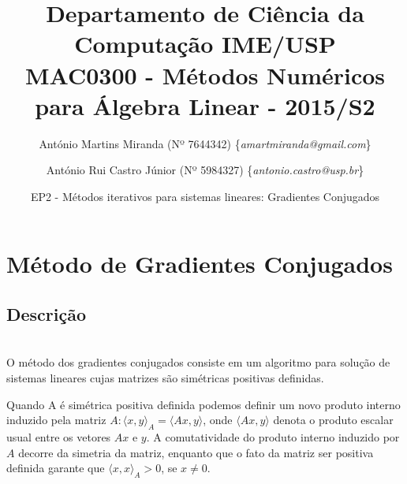 \documentclass[a4paper,11pt]{article}
\begin{document}
\lstset{language=C}
\small{
  \title{
    {\small
      Departamento de Ciência da Computação \hfill IME/USP}\\\vspace{0.1in}
    MAC0300 - Métodos Numéricos para Álgebra Linear - 2015/S2
  }
  \vspace{-0.6in}
  \author{
    António Martins Miranda (Nº 7644342) \{\textit{amartmiranda@gmail.com}\} \\
    \and
    António Rui Castro Júnior (Nº 5984327) \{\textit{antonio.castro@usp.br}\}
    \vspace{-0.6in}
  }
  \date{EP2 - Métodos iterativos para sistemas lineares: Gradientes Conjugados}
  \maketitle
}
\vspace {-0.3in}
\thispagestyle{empty}

\setlength{\parindent}{5ex}

\section{Método de Gradientes Conjugados}
\subsection{Descrição}
\ \\
O método dos gradientes conjugados consiste em um algoritmo para solução
de sistemas lineares cujas matrizes são simétricas positivas definidas.

Quando A é simétrica positiva definida podemos definir um novo produto interno
induzido pela matriz $A: \langle x,y \rangle_{A} = \langle Ax, y \rangle$, onde
$\langle Ax, y \rangle$ denota o produto escalar usual entre os vetores $Ax$ e $y$.
A comutatividade do produto interno induzido por $A$ decorre da simetria da matriz,
enquanto que o fato da matriz ser positiva definida garante que $\langle x, x
\rangle_{A} > 0$, se $x\neq0$.
\end{document}
